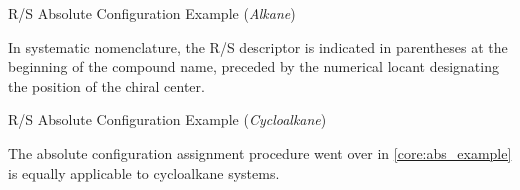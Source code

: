 \documentclass[10pt]{article}
\begin{document}
\begin{core}[label=core:abs_example]{R/S Absolute Configuration Example (\textit{Alkane})}
\begin{enumerate}
        \end{enumerate}

        In systematic nomenclature, the R/S descriptor is indicated in parentheses at the beginning of the compound name, preceded by the numerical locant designating the position of the chiral center.


      \end{core}

      \begin{core}{R/S Absolute Configuration Example (\textit{Cycloalkane})}

        The absolute configuration assignment procedure went over in \autoref{core:abs_example} is equally applicable to cycloalkane systems.


      \end{core}
  
\end{document}
